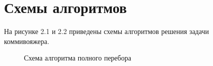 \documentclass[12pt]{report}
\begin{document}
\section{Схемы алгоритмов}
На рисунке 2.1 и 2.2 приведены схемы алгоритмов решения задачи коммивояжера.\\

\newpage
\begin{figure}[h]
        	\caption{Схема алгоритма полного перебора}
        	\label{fig:f_p}
\end{figure}
        \newpage   
\end{document}
